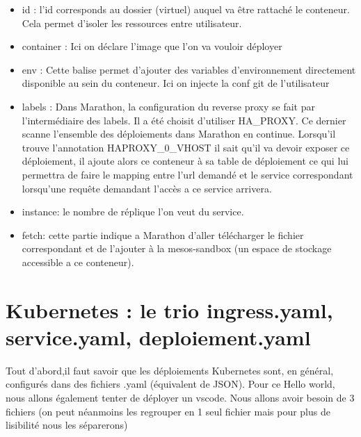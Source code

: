 \documentclass[11pt,fleqn]{book} %
\begin{document}
\begin{itemize}
    \item id : l'id corresponds au dossier (virtuel) auquel va être rattaché le conteneur. Cela permet d'isoler les ressources entre utilisateur.
    \item container : Ici on déclare l'image que l'on va vouloir déployer
    \item env : Cette balise permet d'ajouter des variables d'environnement directement disponible au sein du conteneur. Ici on injecte la conf git de l'utilisateur   
    \item labels : Dans Marathon, la configuration du reverse proxy se fait par l'intermédiaire des labels. Il a été choisit d'utiliser HA\_PROXY. Ce dernier scanne l'ensemble des déploiements dans Marathon en continue. Lorsqu'il trouve l'annotation HAPROXY\_0\_VHOST il sait qu'il va devoir exposer ce déploiement, il ajoute alors ce conteneur à sa table de déploiement ce qui lui permettra de faire le mapping entre l'url demandé et le service correspondant lorsqu'une requête demandant l'accès a ce service
    arrivera.   
    \item instance: le nombre de réplique l'on veut du service.
    \item fetch: cette partie indique a Marathon d'aller télécharger le fichier correspondant et de l'ajouter à la mesos-sandbox (un espace de stockage accessible a ce conteneur).
\end{itemize}
\section*{Kubernetes : le trio ingress.yaml, service.yaml, deploiement.yaml}

Tout d'abord,il faut savoir que les déploiements Kubernetes sont, en général, configurés dans des fichiers .yaml (équivalent de JSON). Pour ce Hello world, nous allons également tenter de déployer un vscode. Nous allons avoir besoin de 3 fichiers (on peut néanmoins les regrouper en 1 seul fichier mais pour plus de lisibilité nous les séparerons) 
\end{document}
